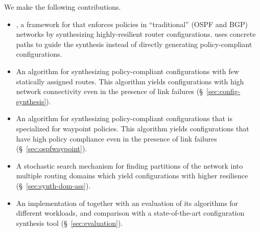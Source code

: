  We make the following contributions.
\begin{itemize}	
    \item \name, a framework for
	that enforces policies in ``traditional'' (OSPF and BGP) networks
	by synthesizing highly-resilient router configurations. 		
	\name  uses concrete
	paths to guide the synthesis  
	instead of directly generating policy-compliant
	configurations.

	\item An algorithm for synthesizing policy-compliant
          configurations with few statically assigned routes. This
          algorithm yields configurations with high network
          connectivity even in the presence of link failures
          (\S~\ref{sec:config-synthesis}).

	\item An algorithm for synthesizing policy-compliant 		
		 configurations that is specialized for waypoint policies. 
		 This algorithm yields configurations that have
		 high policy compliance even in the presence of link failures (\S~\ref{sec:ospfwaypoint}). 
	
	\item A stochastic search mechanism for finding 
		partitions of the network into multiple routing domains which
		yield configurations with higher resilience (\S~\ref{sec:synth-dom-ass}).
	
	\item An implementation of \name together with an evaluation
          of its algorithms for different workloads, and comparison with a state-of-the-art
          configuration synthesis tool (\S~\ref{sec:evaluation}).
\end{itemize}
